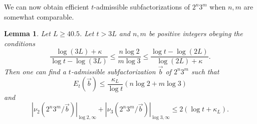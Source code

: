 \documentclass[12pt,a4paper,reqno]{amsart}
\numberwithin{equation}{section}
\theoremstyle{plain}
\newtheorem{lemma}[theorem]{Lemma}
\theoremstyle{definition}
\begin{document}
We can now obtain efficient $t$-admissible subfactorizations of $2^n 3^m$ when $n,m$ are somewhat comparable.

\begin{lemma}\label{bound23}  Let $L \geq 40.5$.  Let $t > 3L$ and $n,m$ be positive integers obeying the conditions
\begin{equation}\label{B-bound}
\frac{\log(3L)+\kappa}{\log t - \log(3L)} \leq \frac{n \log 2}{m \log 3} \leq \frac{\log t - \log(2L)}{\log(2L)+\kappa}.
\end{equation}
Then one can find a $t$-admissible subfactorization $\vec b$ of $2^n 3^m$ such that
\begin{equation}\label{excess-bound} 
  E_t(\vec b) \leq \frac{\kappa_L}{\log t} (n \log 2 + m \log 3)
\end{equation}
and
\begin{equation}\label{surplus-bound} 
  |\nu_2(2^n 3^m/\vec b)|_{\log 2,\infty} + |\nu_3(2^n 3^m/\vec b)|_{\log 3,\infty}  \leq 2(\log t + \kappa_L).
\end{equation}
\end{lemma}
\end{document}
